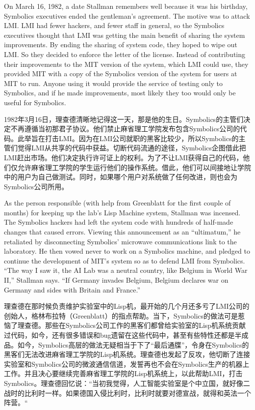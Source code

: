 \ifdefined\eng
On March 16, 1982, a date Stallman remembers well because it was his birthday, Symbolics executives ended the gentleman's agreement. The motive was to attack LMI. LMI had fewer hackers, and fewer staff in general, so the Symbolics executives thought that LMI was getting the main benefit of sharing the system improvements.  By ending the sharing of system code, they hoped to wipe out LMI.  So they decided to enforce the letter of the license.  Instead of contributing their improvements to the MIT version of the system, which LMI could use, they provided MIT with a copy of the Symbolics version of the system for users at MIT to run.  Anyone using it would provide the service of testing only to Symbolics, and if he made improvements, most likely they too would only be useful for Symbolics.
\fi

\ifdefined\chs
1982年3月16日，理查德清晰地记得这一天，那是他的生日。Symbolics的主管们决定不再遵循当初那君子协议。他们禁止麻省理工学院发布包含Symbolics公司的代码。此举旨在打击LMI。因为在LMI公司就职的黑客比较少，所以Symbolics的主管们觉得LMI从共享的代码中获益。切断代码流通的途径，Symbolics企图借此把LMI赶出市场。他们决定执行许可证上的权利。为了不让LMI获得自己的代码，他们仅允许麻省理工学院的学生运行他们的操作系统。借此，他们可以间接地让学院中的用户为自己做测试。同时，如果哪个用户对系统做了任何改进，则也会为Symbolics公司所用。
\fi

\ifdefined\eng
As the person responsible (with help from Greenblatt for the first couple of months) for keeping up the lab's Lisp Machine system, Stallman was incensed. The Symbolics hackers had left the system code with hundreds of half-made changes that caused errors. Viewing this announcement as an ``ultimatum,'' he retaliated by disconnecting Symbolics' microwave communications link to the laboratory. He then vowed never to work on a Symbolics machine, and pledged to continue the development of MIT's system so as to defend LMI from Symbolics. ``The way I saw it, the AI Lab was a neutral country, like Belgium in World War II,'' Stallman says. ``If Germany invades Belgium, Belgium declares war on Germany and sides with Britain and France.''
\fi

\ifdefined\chs
理查德在那时候负责维护实验室中的Lisp机，最开始的几个月还多亏了LMI公司的创始人，格林布拉特（Greenblatt）的指点帮助。当下，Symbolics的做法可是惹恼了理查德。那些在Symbolics公司工作的黑客们都曾给实验室的Lisp机系统贡献过代码，如今，还有很多错误和bug遗留在这些代码中，甚至有些特性还都是半成品。如今，Symbolics高层的做法无疑相当于下了``最后通牒''，令身在Symbolics的黑客们无法改进麻省理工学院的Lisp机系统。理查德也发起了反攻，他切断了连接实验室和Symbolics公司的微波通信信道，发誓再也不会在Symbolics生产的机器上工作。并且决心要继续完善麻省理工学院的Lisp机系统上，以此帮助LMI，打击Symbolics。理查德回忆说：``当初我觉得，人工智能实验室是个中立国，就好像二战时的比利时一样。如果德国入侵比利时，比利时就要对德宣战，就得和英法一个阵营。``
\fi

